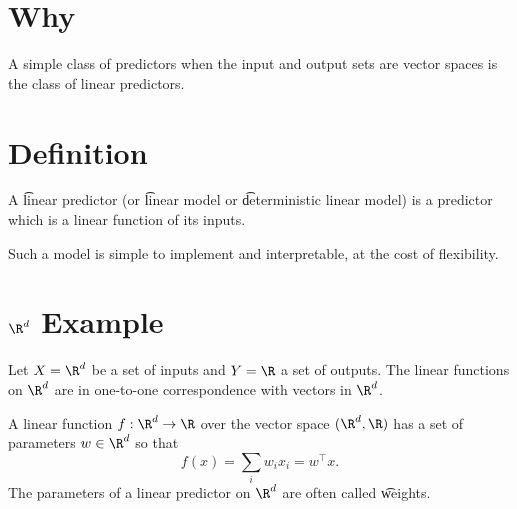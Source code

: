 
\section*{Why}

A simple class of predictors when the input and output sets are vector spaces is the class of linear predictors.


\section*{Definition}

A \t{linear predictor} (or \t{linear model} or \t{deterministic linear model}) is a predictor which is a linear function of its inputs.

Such a model is simple to implement and interpretable, at the cost of flexibility.

\section*{$\R ^d$ Example}

Let $X = \R ^d$ be a set of inputs and $Y = \R $ a set of outputs.
The linear functions on $\R ^d$ are in one-to-one correspondence with vectors in $\R ^d$.

A linear function $f: \R ^d \to \R $ over the vector space $(\R ^d, \R )$ has a set of parameters $w \in \R ^d$ so that
\[
f(x) = \sum_{i} w_i x_i = w^\top  x.
\]
The parameters of a linear predictor on $\R ^d$ are often called \t{weights}.

\blankpage